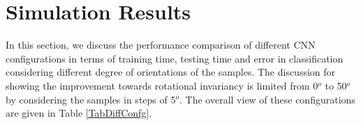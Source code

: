 \section{Simulation Results}
\label{SR}
In this section, we discuss the performance comparison of different CNN configurations in terms of training time, testing time and error in classification considering different degree of orientations of the samples. The discussion for showing the improvement towards rotational invariancy is limited from 0$^o$ to 50$^o$ by considering the samples in steps of 5$^o$. The overall view of these configurations are given in Table \ref{TabDiffConfg}.\\

\begin{table*}
\centering
\caption{Different configurations of CNNs}
\end{table*}
